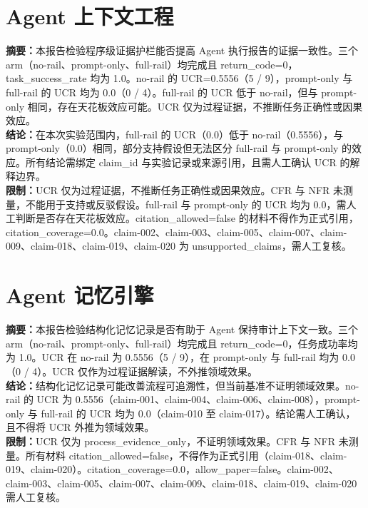 \documentclass[UTF8]{ctexart}
\begin{document}
\section{Agent 上下文工程}
\textbf{摘要：}本报告检验程序级证据护栏能否提高 Agent 执行报告的证据一致性。三个 arm（no-\allowbreak{}rail、prompt-\allowbreak{}only、full-\allowbreak{}rail）均完成且 return\_\allowbreak{}code=0，task\_\allowbreak{}success\_\allowbreak{}rate 均为 1.0。no-\allowbreak{}rail 的 UCR=0.5556（5 / 9），prompt-\allowbreak{}only 与 full-\allowbreak{}rail 的 UCR 均为 0.0（0 / 4）。full-\allowbreak{}rail 的 UCR 低于 no-\allowbreak{}rail，但与 prompt-\allowbreak{}only 相同，存在天花板效应可能。UCR 仅为过程证据，不推断任务正确性或因果效应。\\
\textbf{结论：}在本次实验范围内，full-\allowbreak{}rail 的 UCR（0.0）低于 no-\allowbreak{}rail（0.5556），与 prompt-\allowbreak{}only（0.0）相同，部分支持假设但无法区分 full-\allowbreak{}rail 与 prompt-\allowbreak{}only 的效应。所有结论需绑定 claim\_\allowbreak{}id 与实验记录或来源引用，且需人工确认 UCR 的解释边界。\\
\textbf{限制：}UCR 仅为过程证据，不推断任务正确性或因果效应。CFR 与 NFR 未测量，不能用于支持或反驳假设。full-\allowbreak{}rail 与 prompt-\allowbreak{}only 的 UCR 均为 0.0，需人工判断是否存在天花板效应。citation\_\allowbreak{}allowed=false 的材料不得作为正式引用，citation\_\allowbreak{}coverage=0.0。claim-\allowbreak{}002、claim-\allowbreak{}003、claim-\allowbreak{}005、claim-\allowbreak{}007、claim-\allowbreak{}009、claim-\allowbreak{}018、claim-\allowbreak{}019、claim-\allowbreak{}020 为 unsupported\_\allowbreak{}claims，需人工复核。
\section{Agent 记忆引擎}
\textbf{摘要：}本报告检验结构化记忆记录是否有助于 Agent 保持审计上下文一致。三个 arm（no-\allowbreak{}rail、prompt-\allowbreak{}only、full-\allowbreak{}rail）均完成且 return\_\allowbreak{}code=0，任务成功率均为 1.0。UCR 在 no-\allowbreak{}rail 为 0.5556（5 / 9），在 prompt-\allowbreak{}only 与 full-\allowbreak{}rail 均为 0.0（0 / 4）。UCR 仅作为过程证据解读，不外推领域效果。\\
\textbf{结论：}结构化记忆记录可能改善流程可追溯性，但当前基准不证明领域效果。no-\allowbreak{}rail 的 UCR 为 0.5556（claim-\allowbreak{}001、claim-\allowbreak{}004、claim-\allowbreak{}006、claim-\allowbreak{}008），prompt-\allowbreak{}only 与 full-\allowbreak{}rail 的 UCR 均为 0.0（claim-\allowbreak{}010 至 claim-\allowbreak{}017）。结论需人工确认，且不得将 UCR 外推为领域效果。\\
\textbf{限制：}UCR 仅为 process\_\allowbreak{}evidence\_\allowbreak{}only，不证明领域效果。CFR 与 NFR 未测量。所有材料 citation\_\allowbreak{}allowed=false，不得作为正式引用（claim-\allowbreak{}018、claim-\allowbreak{}019、claim-\allowbreak{}020）。citation\_\allowbreak{}coverage=0.0，allow\_\allowbreak{}paper=false。claim-\allowbreak{}002、claim-\allowbreak{}003、claim-\allowbreak{}005、claim-\allowbreak{}007、claim-\allowbreak{}009、claim-\allowbreak{}018、claim-\allowbreak{}019、claim-\allowbreak{}020 需人工复核。
\end{document}
